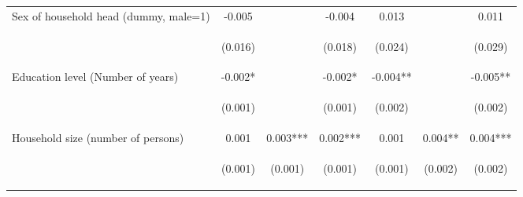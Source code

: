 \begin{center}
\begin{tabular}{lcccccc}
Sex of household head (dummy, male=1) & -0.005 &  & -0.004 & 0.013 &  & 0.011 \\
\vspace{4pt} & \begin{footnotesize}(0.016)\end{footnotesize} & \begin{footnotesize}\end{footnotesize} & \begin{footnotesize}(0.018)\end{footnotesize} & \begin{footnotesize}(0.024)\end{footnotesize} & \begin{footnotesize}\end{footnotesize} & \begin{footnotesize}(0.029)\end{footnotesize} \\
Education level (Number of years) & -0.002* &  & -0.002* & -0.004** &  & -0.005** \\
\vspace{4pt} & \begin{footnotesize}(0.001)\end{footnotesize} & \begin{footnotesize}\end{footnotesize} & \begin{footnotesize}(0.001)\end{footnotesize} & \begin{footnotesize}(0.002)\end{footnotesize} & \begin{footnotesize}\end{footnotesize} & \begin{footnotesize}(0.002)\end{footnotesize} \\
Household size (number of persons) & 0.001 & 0.003*** & 0.002*** & 0.001 & 0.004** & 0.004*** \\
\vspace{4pt} & \begin{footnotesize}(0.001)\end{footnotesize} & \begin{footnotesize}(0.001)\end{footnotesize} & \begin{footnotesize}(0.001)\end{footnotesize} & \begin{footnotesize}(0.001)\end{footnotesize} & \begin{footnotesize}(0.002)\end{footnotesize} & \begin{footnotesize}(0.002)\end{footnotesize} \\

\end{tabular}
\end{center}
